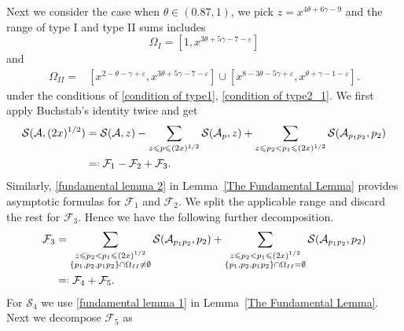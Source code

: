 \documentclass[12pt, reqno, twoside, letterpaper]{amsart}
\numberwithin{equation}{section}
\newcommand{\cA}{\ensuremath{\mathcal{A}}}
\newcommand{\cF}{\ensuremath{\mathcal{F}}}
\newcommand{\cS}{\ensuremath{\mathcal{S}}}
\theoremstyle{customthm}
\theoremstyle{customrem}
\newcommand*{\eqdef}{=\mathrel{\vcenter{\baselineskip0.5ex \lineskiplimit0pt
			\hbox{\scriptsize.}\hbox{\scriptsize.}}}%
}
\begin{document}
Next we consider the case when $\theta \in (0.87,1)$, we pick $z=x^{4\theta+6\gamma-9}$ and the range of type I and type II sums includes
$$
\Omega_I = [1,x^{3\theta+5\gamma-7-\varepsilon}]
$$
and
\begin{align*}
	\Omega_{II} = &[x^{2-\theta-\gamma+\varepsilon},x^{3\theta+5\gamma-7-\varepsilon}] \cup [x^{8-3\theta-5\gamma+\varepsilon},x^{\theta+\gamma-1-\varepsilon}].
\end{align*}
under the conditions of \eqref{condition of type1}, \eqref{condition of type2_1}. We first apply Buchstab’s identity twice and get
\begin{align}\label{f1f2f3}
\nonumber	\cS(\cA,(2x)^{1/2}) &= \cS(\cA,z) - \sum_{z \leqslant p \leqslant (2x)^{1/2}} \cS(\cA_p,z) + \sum_{z \leqslant p_2 < p_1 \leqslant (2x)^{1/2}} \cS(\cA_{p_1p_2},p_2) \\
	& \eqdef \cF_1 - \cF_2 + \cF_3.
\end{align}
Similarly, \eqref{fundamental lemma 2} in Lemma~\ref{The Fundamental Lemma} provides asymptotic formulas for $\cF_1$ and $\cF_2$. We split the applicable range and discard the rest for $\cF_3$. Hence we have the following further decomposition.
\begin{align}\label{f4f5}
\nonumber	\cF_3 &= \sum_{\substack{z \leqslant p_2 < p_1 \leqslant (2x)^{1/2} \\ \{p_1,p_2,p_1p_2\} \cap \Omega_{II} \neq \emptyset}} \cS(\cA_{p_1p_2},p_2) + \sum_{\substack{z \leqslant p_2 < p_1 \leqslant (2x)^{1/2} \\ \{p_1,p_2,p_1p_2\} \cap \Omega_{II} =                                                                    \emptyset}} \cS(\cA_{p_1p_2},p_2) \\
& \eqdef \cF_4 + \cF_5. 
\end{align}
For $\cS_4$ we use \eqref{fundamental lemma 1} in Lemma~\ref{The Fundamental Lemma}. Next we decompose $\cF_5$ as
\end{document}
